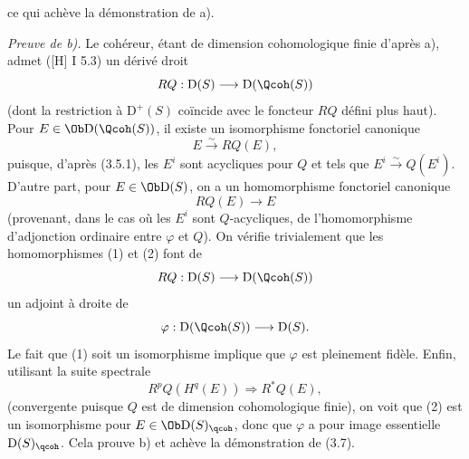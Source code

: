 ce qui achève la
démonstration de a).

\emph{Preuve de b).} Le cohéreur, étant de dimension cohomologique finie d'après a), admet ([H] I 5.3) un dérivé droit
\[
 RQ:\mathrm D(S)\longrightarrow\mathrm D(\Qcoh(S))
\]
(dont la restriction à $\mathrm D^+(S)$ coïncide avec le foncteur $RQ$ défini plus haut). Pour $E\in\Ob\mathrm D(\Qcoh(S))$, il existe un isomorphisme fonctoriel canonique
\begin{equation}\tag{1}
 E\xrightarrow{\sim}RQ(E),
\end{equation}
puisque, d'après (3.5.1), les $E^i$ sont acycliques pour $Q$ et tels que $E^i\xrightarrow{\sim}Q(E^i)$. D'autre part, pour $E\in\Ob\mathrm D(S)$, on a un homomorphisme fonctoriel canonique
\begin{equation}\tag{2}
 RQ(E)\longrightarrow E
\end{equation}
(provenant, dans le cas où les $E^i$ sont $Q$-acycliques, de l'homomorphisme d'adjonction ordinaire entre $\varphi$ et $Q$). On vérifie trivialement que les homomorphismes (1) et (2) font de
\[
 RQ:\mathrm D(S)\longrightarrow\mathrm D(\Qcoh(S))
\]
un adjoint à droite de
\[
 \varphi:\mathrm D(\Qcoh(S))\longrightarrow\mathrm D(S).
\]
Le fait que (1) soit un isomorphisme implique que $\varphi$ est pleinement fidèle. Enfin, utilisant la suite spectrale
\[
 R^pQ(H^q(E))\Longrightarrow R^{*}Q(E),
\]
(convergente puisque $Q$ est de dimension cohomologique finie), on voit que (2) est un isomorphisme pour $E\in\Ob\mathrm D(S)_{\qcoh}$, donc que $\varphi$ a pour image essentielle $\mathrm D(S)_{\qcoh}$. Cela prouve b) et achève la démonstration de (3.7).

